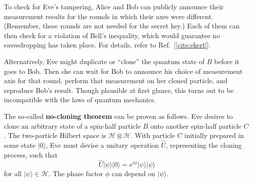 \documentclass[pra,12pt]{revtex4-2}
\begin{document}
To check for Eve's tampering, Alice and Bob can publicly announce
their measurement results for the rounds in which their axes were
different.  (Remember, these rounds are not needed for the secret
key.)  Each of them can then check for a violation of Bell's
inequality, which would guarantee no eavesdropping has taken place.
For details, refer to Ref.~[\ref{cite:ekert}].

Alternatively, Eve might duplicate or ``clone'' the quantum state of
$B$ before it goes to Bob.  Then she can wait for Bob to announce his
choice of measurement axis for that round, perform that measurement on
her cloned particle, and reproduce Bob's result.  Though plausible at
first glance, this turns out to be incompatible with the laws of
quantum mechanics.

The so-called \textbf{no-cloning theorem} can be proven as follows.
Eve desires to clone an arbitrary state of a spin-half particle $B$
onto another spin-half particle $C$.  The two-particle Hilbert space
is $\mathscr{H}\otimes\mathscr{H}$.  With particle $C$ initially
prepared in some state $|0\rangle$, Eve must devise a unitary
operation $\hat{U}$, representing the cloning process, such that
\begin{equation}
  \hat{U} |\psi\rangle | 0\rangle = e^{i\phi} |\psi\rangle |\psi\rangle
  \label{clone}
\end{equation}
for all $|\psi\rangle \in \mathscr{H}$.  The phase factor $\phi$ can
depend on $|\psi\rangle$.
\end{document}
